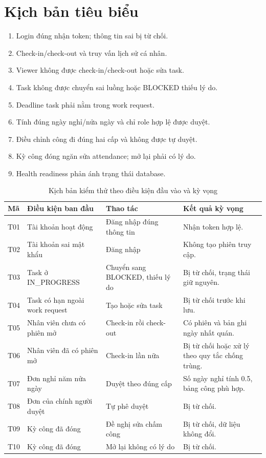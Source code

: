 \documentclass[12pt,a4paper,oneside]{report}
\begin{document}
\section{Kịch bản tiêu biểu}
\begin{enumerate}
\item Login đúng nhận token; thông tin sai bị từ chối.
\item Check-in/check-out và truy vấn lịch sử cá nhân.
\item Viewer không được check-in/check-out hoặc sửa task.
\item Task không được chuyển sai luồng hoặc BLOCKED thiếu lý do.
\item Deadline task phải nằm trong work request.
\item Tính đúng ngày nghỉ/nửa ngày và chỉ role hợp lệ được duyệt.
\item Điều chỉnh công đi đúng hai cấp và không được tự duyệt.
\item Kỳ công đóng ngăn sửa attendance; mở lại phải có lý do.
\item Health readiness phản ánh trạng thái database.
\end{enumerate}

\begin{longtable}{p{1.3cm}p{3.3cm}p{5.3cm}p{3.7cm}}\caption{Kịch bản kiểm thử theo điều kiện đầu vào và kỳ vọng}\label{tab:scenarios}\\\toprule
\textbf{Mã}&\textbf{Điều kiện ban đầu}&\textbf{Thao tác}&\textbf{Kết quả kỳ vọng}\\\midrule
T01&Tài khoản hoạt động&Đăng nhập đúng thông tin&Nhận token hợp lệ.\\
T02&Tài khoản sai mật khẩu&Đăng nhập&Không tạo phiên truy cập.\\
T03&Task ở IN\_PROGRESS&Chuyển sang BLOCKED, thiếu lý do&Bị từ chối, trạng thái giữ nguyên.\\
T04&Task có hạn ngoài work request&Tạo hoặc sửa task&Bị từ chối trước khi lưu.\\
T05&Nhân viên chưa có phiên mở&Check-in rồi check-out&Có phiên và bản ghi ngày nhất quán.\\
T06&Nhân viên đã có phiên mở&Check-in lần nữa&Bị từ chối hoặc xử lý theo quy tắc chống trùng.\\
T07&Đơn nghỉ năm nửa ngày&Duyệt theo đúng cấp&Số ngày nghỉ tính 0.5, bảng công phù hợp.\\
T08&Đơn của chính người duyệt&Tự phê duyệt&Bị từ chối.\\
T09&Kỳ công đã đóng&Đề nghị sửa chấm công&Bị từ chối, dữ liệu không đổi.\\
T10&Kỳ công đã đóng&Mở lại không có lý do&Bị từ chối.\\\bottomrule
\end{longtable}
\end{document}
